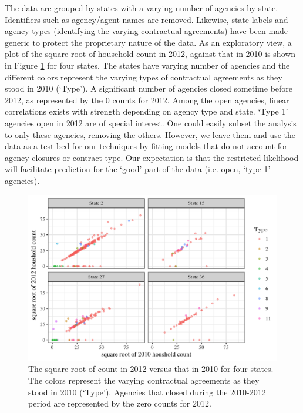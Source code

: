\documentclass[ba]{imsart}
\begin{document}
The data are grouped by states with a varying number of agencies by state. Identifiers such as agency/agent names are removed. Likewise, state labels and agency types (identifying the varying contractual agreements) have been made generic to protect the proprietary nature of the data.
As an exploratory view, a plot of the square root of household count in 2012, against that in 2010 
is shown in Figure \ref{fig:ctVct} for four states. The states have varying number of agencies and  the different colors represent the varying types of contractual agreements as they stood in 2010 (`Type').  A significant number of agencies closed sometime before 2012, as represented by the $0$ counts for 2012. Among the open agencies, linear correlations exists with strength depending on agency type and state.  `Type 1' agencies open in 2012 are of special interest.  One could easily subset the analysis to only these agencies, removing the others. However,  we leave them and use the data as a test bed for our techniques by fitting models that do not account for agency closures or contract type.  Our expectation is that the restricted likelihood will facilitate prediction for the `good' part of the data (i.e. open, `type 1' agencies). 

\begin{figure}[t]
\centering
\includegraphics[width=5in]{scatter_by_state.png}
\caption{The square root of count in 2012 versus that in 2010 for four states. The colors represent the varying contractual agreements as they stood in 2010 (`Type').  Agencies that closed during the 2010-2012 period are represented by the zero counts for 2012.}
\label{fig:ctVct}
\end{figure}
\end{document}
